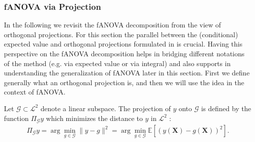 \subsubsection{fANOVA via Projection}
In the following we revisit the fANOVA decomposition from the view of orthogonal projections.
For this section the parallel between the (conditional) expected value and orthogonal projections formulated in \cite{Vaart_1998} is crucial.
Having this perspective on the fANOVA decomposition helps in bridging different notations of the method (e.g. via expected value or via integral) and also supports in understanding the generalization of fANOVA later in this section. First we define generally what an orthogonal projection is, and then we will use the idea in the context of fANOVA.\par

\begin{definition}\label{def:orthogonal_projection}
    Let $\mathcal{G} \subset \mathcal{L}^2$ denote a linear subspace. The projection of $y$ onto $\mathcal{G}$ is defined by the function $\Pi_{\mathcal{G}}y$ which minimizes the distance to $y$ in $\mathcal{L}^2$ \citep{nagler2024mathstat}:
\begin{align}
    \Pi_{\mathcal{G}}y = \arg\min_{g \in \mathcal{G}} \|y - g\|^2
= \arg\min_{g \in \mathcal{G}} \mathbb{E}[(y(\boldsymbol{X}) - g(\boldsymbol{X}))^2].
\end{align}
\end{definition}

